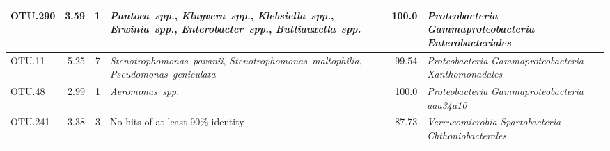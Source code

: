 \begin{longtable}{lrrP{5cm}rP{5cm}}
OTU.290 & 3.59 & 1 & \mbox{\textit{Pantoea spp.}}, \mbox{\textit{Kluyvera spp.}}, \mbox{\textit{Klebsiella spp.}}, \mbox{\textit{Erwinia spp.}}, \mbox{\textit{Enterobacter spp.}}, \mbox{\textit{Buttiauxella spp.}} & 100.0 & \mbox{\textit{Proteobacteria}} \mbox{\textit{Gammaproteobacteria}} \mbox{\textit{Enterobacteriales}} \\ \midrule
OTU.11 & 5.25 & 7 & \mbox{\textit{Stenotrophomonas pavanii}}, \mbox{\textit{Stenotrophomonas maltophilia}}, \mbox{\textit{Pseudomonas geniculata}} & 99.54 & \mbox{\textit{Proteobacteria}} \mbox{\textit{Gammaproteobacteria}} \mbox{\textit{Xanthomonadales}} \\ \midrule
OTU.48 & 2.99 & 1 & \mbox{\textit{Aeromonas spp.}} & 100.0 & \mbox{\textit{Proteobacteria}} \mbox{\textit{Gammaproteobacteria}} \mbox{\textit{aaa34a10}} \\ \midrule
OTU.241 & 3.38 & 3 & {No hits of at least 90\% identity} & 87.73 & \mbox{\textit{Verrucomicrobia}} \mbox{\textit{Spartobacteria}} \mbox{\textit{Chthoniobacterales}} \\ \midrule

\bottomrule
\end{longtable}
 
\restoregeometry
